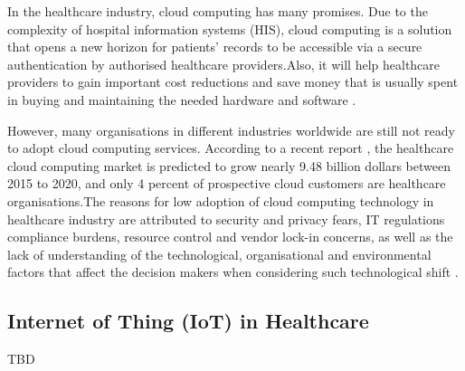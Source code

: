 In the healthcare industry, cloud computing has many promises. Due to the complexity of hospital information systems (HIS), cloud computing is a solution that opens a new horizon for patients’ records to be accessible via a secure authentication by authorised healthcare providers\cite{Grindle2013}.Also, it will help healthcare providers to gain important cost reductions and save money that is usually spent in buying and maintaining the needed hardware and software \cite{ahuja2012survey,Masrom2014}.

However, many organisations in different industries worldwide are still not ready to adopt cloud computing services. According to a recent report \cite{MarketsandMarkets}, the healthcare cloud computing market is predicted to grow nearly 9.48 billion dollars between 2015 to 2020, and only 4 percent of prospective cloud customers are healthcare organisations.The reasons for low adoption of cloud computing technology in healthcare industry are attributed to security and privacy fears, IT regulations compliance burdens, resource control and vendor lock-in concerns, as well as the lack of understanding of the technological, organisational and environmental factors that affect the decision makers when considering such technological shift \cite{MarketsandMarkets,tweel2012examining}.



\subsection{Internet of Thing (IoT) in Healthcare}

TBD

